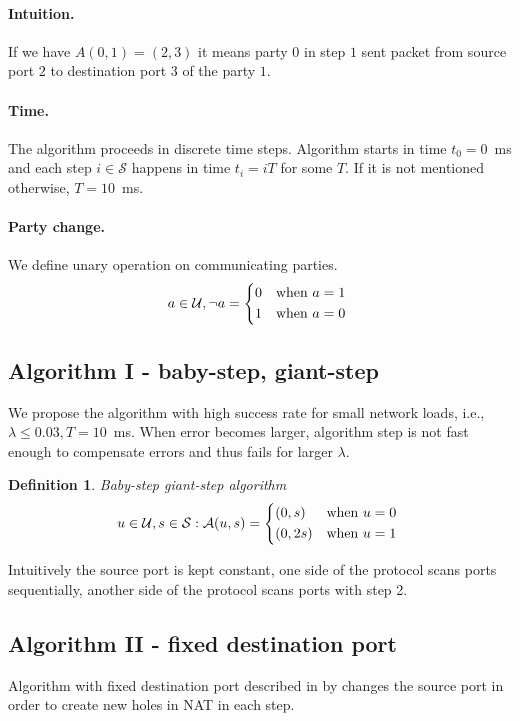 \documentclass[twoside]{article}
\newtheorem{mydef}{Definition}
\begin{document}
\begin{multicols}{2}
\paragraph{Intuition.} 
If we have $A(0,1) = (2,3)$ it means party $0$ in step $1$ sent packet from source port $2$ to destination port $3$
of the party $1$.

\paragraph{Time.} 
The algorithm proceeds in discrete time steps. Algorithm starts in time $t_0 = 0$~ms and each step $i \in \mathcal{S}$
happens in time $t_i = iT$ for some $T$. If it is not mentioned otherwise, $T = 10$~ms.

\paragraph{Party change.} 
We define unary operation on communicating parties. 
\[
a \in \mathcal{U},  \neg a = \begin{dcases*}
         0 & when $a=1$\\
         1 & when $a=0$
        \end{dcases*}
\]

\subsection{Algorithm I - baby-step, giant-step}
We propose the algorithm with high success rate for small network loads, i.e.,
$\lambda \leq 0.03, T=10$~ms. When error becomes larger,
algorithm step is not fast enough to compensate errors and thus fails for larger $\lambda$.

\begin{mydef}
Baby-step giant-step algorithm
\[
u \in \mathcal{U}, s \in \mathcal{S}: 
\mathcal{A}(u, s) = \begin{dcases*}
         (0, s)  & when $u=0$\\
         (0, 2s) & when $u=1$
        \end{dcases*}
\]
\end{mydef}

Intuitively the source port is kept constant, one side of the protocol scans ports sequentially, another
side of the protocol scans ports with step 2.

\subsection{Algorithm II - fixed destination port}
Algorithm with fixed destination port described in by \citep{Wang:2006:RSN:1156422.1156550}
changes the source port in order to create new holes in NAT in each step.


\end{multicols}
\end{document}
